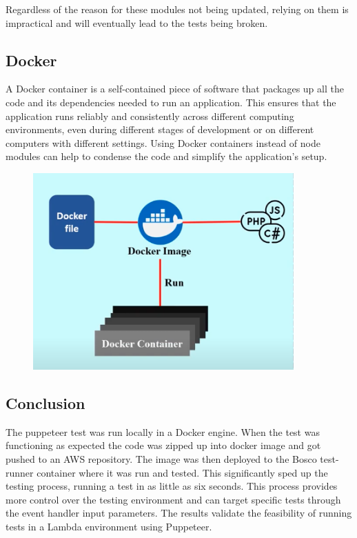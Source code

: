 \documentclass[12pt,a4paper,titlepage]{report}
\begin{document}
Regardless of the reason for these modules not being updated, relying on them is impractical and will eventually lead to the tests being broken.

\subsection{Docker}
 
A Docker container is a self-contained piece of software that packages up all the code and its dependencies needed to run an application. 
This ensures that the application runs reliably and consistently across different computing environments, even during different stages of development or on different computers with different settings. 
Using Docker containers instead of node modules can help to condense the code and simplify the application's setup.
\begin{figure}[H]
  \centering
  \includegraphics[width=10cm]{./diagrams/dockerexplained.png}
 \end{figure}

\subsection{Conclusion}
The puppeteer test was run locally in a Docker engine. When the test was functioning as expected the code was zipped up into docker image and got pushed to an AWS repository. 
The image was then deployed to the Bosco test-runner container where it was run and tested.
This significantly sped up the testing process, running a test in as little as six seconds.
This process provides more control over the testing environment and can target specific tests through the event handler input parameters.
The results validate the feasibility of running tests in a Lambda environment using Puppeteer.
\end{document}
